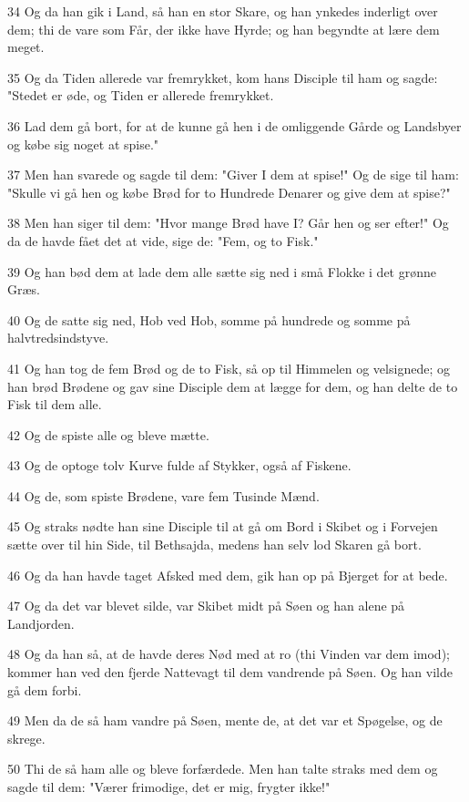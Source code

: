 \par 34 Og da han gik i Land, så han en stor Skare, og han ynkedes inderligt over dem; thi de vare som Får, der ikke have Hyrde; og han begyndte at lære dem meget.
\par 35 Og da Tiden allerede var fremrykket, kom hans Disciple til ham og sagde: "Stedet er øde, og Tiden er allerede fremrykket.
\par 36 Lad dem gå bort, for at de kunne gå hen i de omliggende Gårde og Landsbyer og købe sig noget at spise."
\par 37 Men han svarede og sagde til dem: "Giver I dem at spise!" Og de sige til ham: "Skulle vi gå hen og købe Brød for to Hundrede Denarer og give dem at spise?"
\par 38 Men han siger til dem: "Hvor mange Brød have I? Går hen og ser efter!" Og da de havde fået det at vide, sige de: "Fem, og to Fisk."
\par 39 Og han bød dem at lade dem alle sætte sig ned i små Flokke i det grønne Græs.
\par 40 Og de satte sig ned, Hob ved Hob, somme på hundrede og somme på halvtredsindstyve.
\par 41 Og han tog de fem Brød og de to Fisk, så op til Himmelen og velsignede; og han brød Brødene og gav sine Disciple dem at lægge for dem, og han delte de to Fisk til dem alle.
\par 42 Og de spiste alle og bleve mætte.
\par 43 Og de optoge tolv Kurve fulde af Stykker, også af Fiskene.
\par 44 Og de, som spiste Brødene, vare fem Tusinde Mænd.
\par 45 Og straks nødte han sine Disciple til at gå om Bord i Skibet og i Forvejen sætte over til hin Side, til Bethsajda, medens han selv lod Skaren gå bort.
\par 46 Og da han havde taget Afsked med dem, gik han op på Bjerget for at bede.
\par 47 Og da det var blevet silde, var Skibet midt på Søen og han alene på Landjorden.
\par 48 Og da han så, at de havde deres Nød med at ro (thi Vinden var dem imod); kommer han ved den fjerde Nattevagt til dem vandrende på Søen. Og han vilde gå dem forbi.
\par 49 Men da de så ham vandre på Søen, mente de, at det var et Spøgelse, og de skrege.
\par 50 Thi de så ham alle og bleve forfærdede. Men han talte straks med dem og sagde til dem: "Værer frimodige, det er mig, frygter ikke!"
